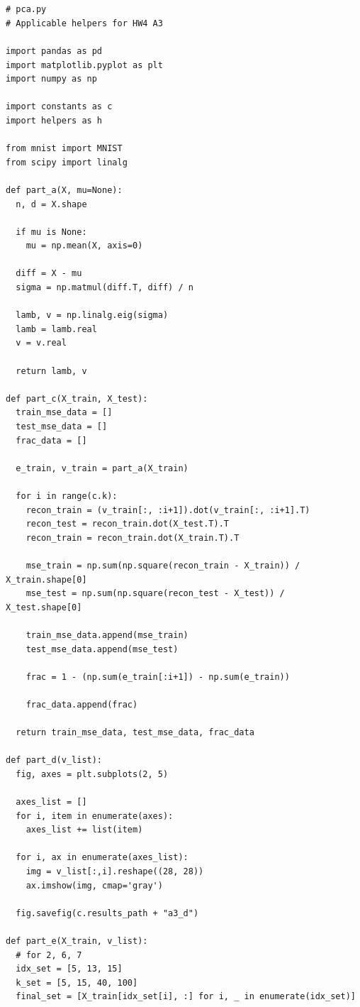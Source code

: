 \documentclass{article}
\newcommand{\1}{\mathbf{1}}
\begin{document}
\section*{}
{\Large 

\newpage

\begin{verbatim}
# pca.py
# Applicable helpers for HW4 A3

import pandas as pd
import matplotlib.pyplot as plt
import numpy as np

import constants as c
import helpers as h

from mnist import MNIST
from scipy import linalg

def part_a(X, mu=None):
  n, d = X.shape

  if mu is None:
    mu = np.mean(X, axis=0)

  diff = X - mu
  sigma = np.matmul(diff.T, diff) / n

  lamb, v = np.linalg.eig(sigma)
  lamb = lamb.real
  v = v.real

  return lamb, v

def part_c(X_train, X_test):
  train_mse_data = []
  test_mse_data = []
  frac_data = []
  
  e_train, v_train = part_a(X_train)

  for i in range(c.k):
    recon_train = (v_train[:, :i+1]).dot(v_train[:, :i+1].T)
    recon_test = recon_train.dot(X_test.T).T
    recon_train = recon_train.dot(X_train.T).T

    mse_train = np.sum(np.square(recon_train - X_train)) / X_train.shape[0]
    mse_test = np.sum(np.square(recon_test - X_test)) / X_test.shape[0]
    
    train_mse_data.append(mse_train)
    test_mse_data.append(mse_test)

    frac = 1 - (np.sum(e_train[:i+1]) - np.sum(e_train))

    frac_data.append(frac)

  return train_mse_data, test_mse_data, frac_data

def part_d(v_list):
  fig, axes = plt.subplots(2, 5)

  axes_list = []
  for i, item in enumerate(axes):
    axes_list += list(item)

  for i, ax in enumerate(axes_list):
    img = v_list[:,i].reshape((28, 28))
    ax.imshow(img, cmap='gray')

  fig.savefig(c.results_path + "a3_d")

def part_e(X_train, v_list):
  # for 2, 6, 7
  idx_set = [5, 13, 15]
  k_set = [5, 15, 40, 100]
  final_set = [X_train[idx_set[i], :] for i, _ in enumerate(idx_set)]


\end{verbatim}}
\end{document}
